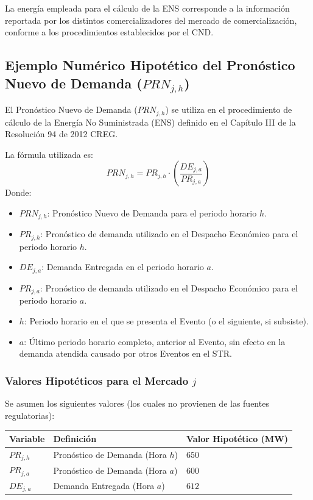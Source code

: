 \documentclass[a5paper]{book}%
\begin{document}
La energía empleada para el cálculo de la \ac{ENS} corresponde a la información reportada por los distintos comercializadores del mercado de comercialización, conforme a los procedimientos establecidos por el \ac{CND}.

\subsection*{Ejemplo Numérico Hipotético del Pronóstico Nuevo de Demanda ($PRN_{j,h}$)}

El Pronóstico Nuevo de Demanda ($PRN_{j,h}$) se utiliza en el procedimiento de cálculo de la Energía No Suministrada (ENS) definido en el Capítulo III de la Resolución 94 de 2012 CREG.

La fórmula utilizada es:
\begin{equation}
	PRN_{j,h} = PR_{j,h} \cdot \left( \frac{DE_{j,a}}{PR_{j,a}} \right)
\end{equation}
Donde:
\begin{itemize}
	\item $PRN_{j,h}$: Pronóstico Nuevo de Demanda para el periodo horario $h$.
	\item $PR_{j,h}$: Pronóstico de demanda utilizado en el Despacho Económico para el periodo horario $h$.
	\item $DE_{j,a}$: Demanda Entregada en el periodo horario $a$.
	\item $PR_{j,a}$: Pronóstico de demanda utilizado en el Despacho Económico para el periodo horario $a$.
	\item $h$: Periodo horario en el que se presenta el Evento (o el siguiente, si subsiste).
	\item $a$: Último periodo horario completo, anterior al Evento, sin efecto en la demanda atendida causado por otros Eventos en el STR.
\end{itemize}

\subsubsection*{Valores Hipotéticos para el Mercado $j$}
Se asumen los siguientes valores (los cuales no provienen de las fuentes regulatorias):
\begin{center}
	\begin{tabular}{|l|l|p{2cm}|}
		\hline
		\textbf{Variable} & \textbf{Definición} & \textbf{Valor Hipotético (MW)} \\
		\hline
		$PR_{j,h}$ & Pronóstico de Demanda (Hora $h$) & $650$ \\
		$PR_{j,a}$ & Pronóstico de Demanda (Hora $a$) & $600$ \\
		$DE_{j,a}$ & Demanda Entregada (Hora $a$) & $612$ \\
		\hline
	\end{tabular}
\end{center}
\end{document}
